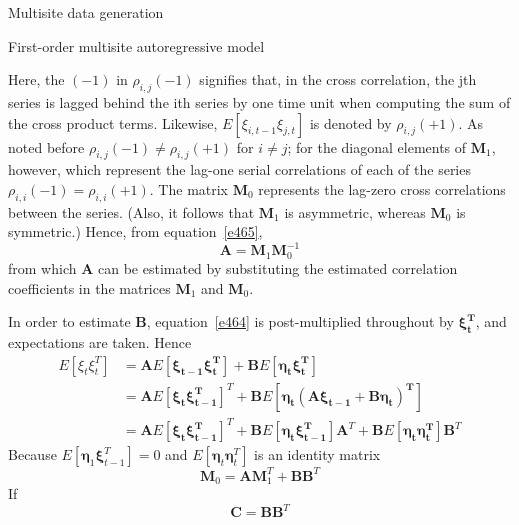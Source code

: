 \documentclass[8pt]{beamer}
\renewcommand{\emph}[1]{\textcolor{myorange}{#1}}
\newcommand{\ve}[1]{\boldsymbol{#1}}
\begin{document}
\begin{frame}{Multisite data generation}
    \begin{block}{First-order multisite autoregressive model}
    \end{block}
    Here, the $(-1)$ in $\rho_{i,j}(-1)$ signifies that, in the \emph{cross correlation}, the jth series is lagged behind the ith series by one time unit when computing the sum of the \emph{cross product terms}. Likewise, $E[\xi_{i,t-1} \xi_{j,t}]$ is denoted by $\rho_{i,j}(+1)$. As noted before $\rho_{i,j}(-1) \neq \rho_{i,j}(+1)$ for $i \neq j$; for the diagonal elements of $\mathbf{M}_1$, however, which represent the lag-one \emph{serial correlations} of each of the series $\rho_{i,i} (-1) = \rho_{i,i} (+1)$. The matrix $\mathbf{M}_0$ represents the \emph{lag-zero cross correlations} between the series. (Also, it follows that $\mathbf{M}_1$ is asymmetric, whereas $\mathbf{M}_0$ is symmetric.) Hence, from equation~\ref{e465},
    \begin{equation}
        \mathbf{A} = \mathbf{M}_1 \mathbf{M}_0^{-1}
        \label{e466}
    \end{equation}
    from which $\mathbf{A}$ can be estimated by substituting the estimated correlation coefficients in the matrices $\mathbf{M}_1$ and $\mathbf{M}_0$. 

    In order to estimate $\mathbf{B}$, equation~\ref{e464} is post-multiplied throughout by $\boldsymbol{\xi_t^T}$, and expectations are taken. Hence
    \begin{align*}
        E[\xi_t \xi_t^T] &= \mathbf{A} E[\boldsymbol{\xi_{t-1} \xi_t^T}] + \mathbf{B} E[\boldsymbol{\eta_t \xi_t^T}] \\
                         &= \mathbf{A} E[\boldsymbol{\xi_{t} \xi_{t-1}^T}]^T + \mathbf{B} E[\boldsymbol{\eta_t(A\xi_{t-1}+B\eta_t)^T}] \\
                         &= \mathbf{A} E[\boldsymbol{\xi_{t} \xi_{t-1}^T}]^T + \mathbf{B} E[\boldsymbol{\eta_t \xi_{t-1}^T}]\mathbf{A}^T  + \mathbf{B}E[\boldsymbol{\eta_t \eta_t^T}] \mathbf{B}^T
    \end{align*}
    Because $E[\ve{\eta}_1 \ve{\xi}_{t-1}^T] = 0$ and $E[\ve{\eta}_t \ve{\eta}_t^T]$ is an identity matrix
    \begin{equation}
        \mathbf{M}_0 = \mathbf{A} \mathbf{M}_1^T + \mathbf{B}\mathbf{B}^T
        \label{e467}
    \end{equation}
    If 
    \begin{equation}
        \mathbf{C} =  \mathbf{B}\mathbf{B}^T
        \label{e468}
    \end{equation}
\end{frame}
\end{document}
